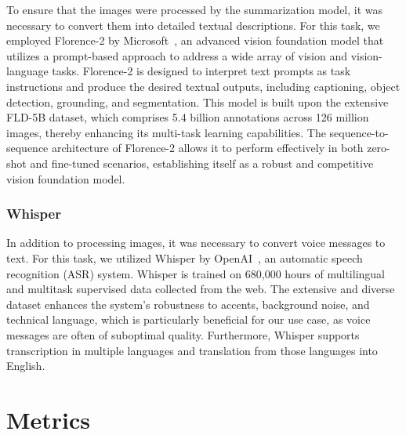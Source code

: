 \documentclass[10pt,twocolumn,letterpaper]{article}
\begin{document}
\hspace{1em}To ensure that the images were processed by the summarization model, it was necessary to convert them into detailed textual descriptions. 
For this task, we employed Florence-2 by Microsoft~\cite{xiao2023florence2advancingunifiedrepresentation}, an advanced vision foundation model that utilizes a prompt-based approach to address a wide array of vision and vision-language tasks. 
Florence-2 is designed to interpret text prompts as task instructions and produce the desired textual outputs, including captioning, object detection, grounding, and segmentation. 
This model is built upon the extensive FLD-5B dataset, which comprises 5.4 billion annotations across 126 million images, thereby enhancing its multi-task learning capabilities. 
The sequence-to-sequence architecture of Florence-2 allows it to perform effectively in both zero-shot and fine-tuned scenarios, establishing itself as a robust and competitive vision foundation model.

\subsubsection{Whisper}

\hspace{1em}In addition to processing images, it was necessary to convert voice messages to text. 
For this task, we utilized Whisper by OpenAI~\cite{radford2022robustspeechrecognitionlargescale}, an automatic speech recognition (ASR) system. 
Whisper is trained on 680,000 hours of multilingual and multitask supervised data collected from the web. 
The extensive and diverse dataset enhances the system's robustness to accents, background noise, and technical language, which is particularly beneficial for our use case, as voice messages are often of suboptimal quality. 
Furthermore, Whisper supports transcription in multiple languages and translation from those languages into English.

\section{Metrics}
\end{document}
